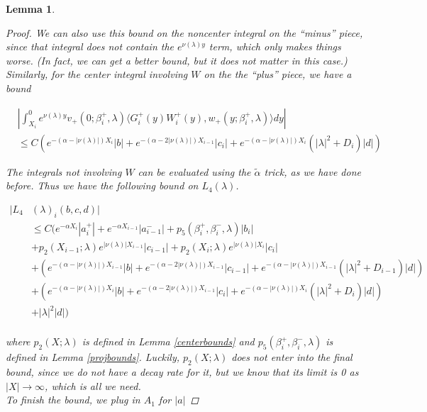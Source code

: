 \documentclass[12pt]{article}
\newtheorem{lemma}{Lemma}
\begin{document}
\begin{lemma}
\begin{proof}
We can also use this bound on the noncenter integral on the ``minus'' piece, since that integral does not contain the $e^{\nu(\lambda)y}$ term, which only makes things worse. (In fact, we can get a better bound, but it does not matter in this case.)\\

Similarly, for the center integral involving $W$ on the the ``plus'' piece, we have a bound

\begin{align*}
&\left| \int_{X_i}^0 e^{\nu(\lambda)y} v_+(0; \beta_i^+, \lambda) \langle G_i^+(y)W_i^+(y), w_+(y; \beta_i^+, \lambda) \rangle dy \right| \\
&\leq C ( e^{-(\alpha - |\nu(\lambda)|) X_i} |b| + e^{-(\alpha - 2 |\nu(\lambda)|) X_{i-1}}|c_i| + e^{-(\alpha - |\nu(\lambda)|) X_i} (|\lambda|^2 + D_i)|d| )
\end{align*}

The integrals not involving $W$ can be evaluated using the $\tilde{\alpha}$ trick, as we have done before. Thus we have the following bound on $L_4(\lambda)$. 

\begin{align*}
|L_4&(\lambda)_i(b, c, d)|\\ 
&\leq C \Big( e^{-\alpha X_i} |a_i^+| +  e^{-\alpha X_{i-1}} |a_{i-1}^-| + p_5(\beta_i^+, \beta_i^-, \lambda) |b_i| \\
&+ p_2(X_{i-1}; \lambda) e^{|\nu(\lambda)|X_{i-1}}|c_{i-1}| 
+ p_2(X_i; \lambda) e^{|\nu(\lambda)|X_i} |c_i| \\
&+ ( e^{-(\alpha - |\nu(\lambda)|) X_{i-1}} |b| + e^{-(\alpha - 2 |\nu(\lambda)|) X_{i-1}}|c_{i-1}| + e^{-(\alpha - |\nu(\lambda)|) X_{i-1}} (|\lambda|^2 + D_{i-1})|d| ) \\
&+ ( e^{-(\alpha - |\nu(\lambda)|) X_i} |b| + e^{-(\alpha - 2 |\nu(\lambda)|) X_{i-1}}|c_i| + e^{-(\alpha - |\nu(\lambda)|) X_i} (|\lambda|^2 + D_i)|d| )  \\
&+ |\lambda|^2 |d| \Big)\\
\end{align*}

where $p_2(X; \lambda)$ is defined in Lemma \ref{centerbounds} and $p_5(\beta_i^+, \beta_i^-, \lambda)$ is defined in Lemma \ref{projbounds}. Luckily, $p_2(X; \lambda)$ does not enter into the final bound, since we do not have a decay rate for it, but we know that its limit is 0 as $|X| \rightarrow \infty$, which is all we need.\\

To finish the bound, we plug in $A_1$ for $|a|$


\end{proof}
\end{lemma}
\end{document}
